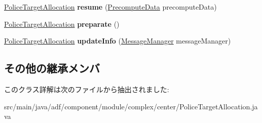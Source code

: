 \begin{DoxyCompactItemize}
\hyperlink{classadf_1_1component_1_1module_1_1complex_1_1center_1_1PoliceTargetAllocation}{Police\+Target\+Allocation} {\bfseries resume} (\hyperlink{classadf_1_1agent_1_1precompute_1_1PrecomputeData}{Precompute\+Data} precompute\+Data)
\item 
\hypertarget{classadf_1_1component_1_1module_1_1complex_1_1center_1_1PoliceTargetAllocation_ac237d20f81ad852deab6fe2c1d65ff69}{}\label{classadf_1_1component_1_1module_1_1complex_1_1center_1_1PoliceTargetAllocation_ac237d20f81ad852deab6fe2c1d65ff69} 
\hyperlink{classadf_1_1component_1_1module_1_1complex_1_1center_1_1PoliceTargetAllocation}{Police\+Target\+Allocation} {\bfseries preparate} ()
\item 
\hypertarget{classadf_1_1component_1_1module_1_1complex_1_1center_1_1PoliceTargetAllocation_a2a543f7458e093a10508c6847e1ee265}{}\label{classadf_1_1component_1_1module_1_1complex_1_1center_1_1PoliceTargetAllocation_a2a543f7458e093a10508c6847e1ee265} 
\hyperlink{classadf_1_1component_1_1module_1_1complex_1_1center_1_1PoliceTargetAllocation}{Police\+Target\+Allocation} {\bfseries update\+Info} (\hyperlink{classadf_1_1agent_1_1communication_1_1MessageManager}{Message\+Manager} message\+Manager)
\end{DoxyCompactItemize}
\subsection*{その他の継承メンバ}


このクラス詳解は次のファイルから抽出されました\+:\begin{DoxyCompactItemize}
\item 
src/main/java/adf/component/module/complex/center/Police\+Target\+Allocation.\+java\end{DoxyCompactItemize}
